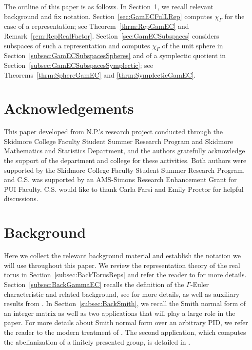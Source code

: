 \documentclass[twoside]{amsart}
\theoremstyle{definition}
\theoremstyle{remark}
\numberwithin{equation}{section}
\begin{document}
The outline of this paper is as follows. In Section~\ref{sec:Back}, we recall relevant background and fix notation. Section~\ref{sec:GamECFulLRep}
computes $\chi_\Gamma$ for the case of a representation; see Theorem~\ref{thrm:RepGamEC} and Remark~\ref{rem:RepRealFactor}.
Section~\ref{sec:GamECSubspaces} considers subspaces of such a representation and computes $\chi_\Gamma$ of the unit sphere in
Section~\ref{subsec:GamECSubspacesSpheres} and of a symplectic quotient in
Section~\ref{subsec:GamECSubspacesSymplectic}; see Theorems~\ref{thrm:SphereGamEC} and \ref{thrm:SymplecticGamEC}.



\section*{Acknowledgements}

This paper developed from N.P.'s research project conducted through the Skidmore College Faculty Student Summer Research Program
and Skidmore Mathematics and Statistics Department, and the authors gratefully acknowledge the support of the department and college for these activities.
Both authors were supported by the Skidmore College Faculty Student Summer Research Program, and
C.S. was supported by an AMS-Simons Research Enhancement Grant for PUI Faculty.
C.S. would like to thank Carla Farsi and Emily Proctor for helpful discussions.


\section{Background}
\label{sec:Back}

Here we collect the relevant background material and establish the notation we will use throughout this paper.
We review the representation theory of the real torus in Section~\ref{subsec:BackTorusReps} and refer the reader to
\cite[Ch.~II, Sec.~8]{BroeckerTomDieck} for more details. Section~\ref{subsec:BackGammaEC} recalls the definition of the
$\Gamma$-Euler characteristic and related background, see \cite{FarSeaJLMS} for more details, as well as auxiliary results from \cite{FarsiMeitSeaton}.
In Section~\ref{subsec:BackSmith}, we recall the Smith normal form of an integer matrix \cite{SmithLinCongr} as well as two
applications that will play a large role in the paper. For more details about Smith normal form over an arbitrary PID, we
refer the reader to the modern treatment of \cite[Sec.~5.3]{AdkinsWeintraub}. The second application, which computes the abelianization
of a finitely presented group, is detailed in \cite[Sec.~9.2]{HoltEickOBrienBook}.
\end{document}

